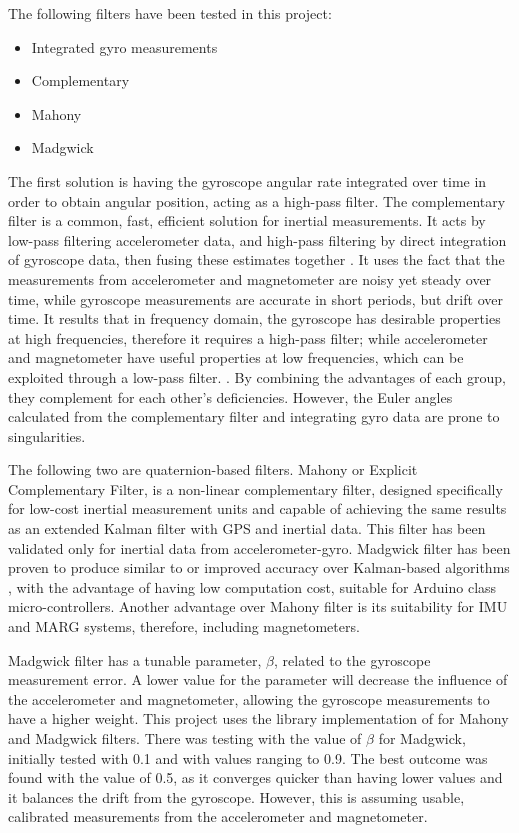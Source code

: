 The following filters have been tested in this project:
 
\begin{itemize}
\item Integrated gyro measurements
\item Complementary
\item Mahony
\item Madgwick
\end{itemize}

The first solution is having the gyroscope angular rate integrated over time in order to obtain angular position, acting as a high-pass filter.
The complementary filter is a common, fast, efficient solution for inertial measurements. It acts by low-pass filtering accelerometer data, and high-pass filtering by direct integration of gyroscope data, then fusing  these estimates together \cite{euston2008complementary}. 
It uses the fact that the measurements from accelerometer and magnetometer are noisy yet steady over time, while gyroscope measurements are accurate in short periods, but drift over time. It results that in frequency domain, the gyroscope has desirable properties at high frequencies, therefore it requires a high-pass filter; while accelerometer and magnetometer have useful properties at low frequencies, which can be exploited through a low-pass filter.  \cite{kok2017using}. By combining the advantages of each group, they complement for each other's deficiencies. However, the Euler angles calculated from the complementary filter and integrating gyro data are prone to singularities. 

The following two are quaternion-based filters. 
Mahony or Explicit Complementary Filter, is a non-linear complementary filter, designed specifically for low-cost inertial measurement units and capable of achieving the same results as an extended Kalman filter with GPS and inertial data. This filter has been validated only for inertial data from accelerometer-gyro. \cite{euston2008complementary}
Madgwick filter has been proven to produce similar to \cite{cirillo2016comparison} or improved accuracy over Kalman-based algorithms \cite{madgwick2010efficient}, with the advantage of having low computation cost, suitable for Arduino class micro-controllers. Another advantage over Mahony filter is its suitability for IMU and MARG systems, therefore, including magnetometers.

Madgwick filter has a tunable parameter, $\beta$, related to the gyroscope measurement error. A lower value for the parameter will decrease the influence of the accelerometer and magnetometer, allowing the gyroscope measurements to have a higher weight\cite{madgwick2010efficient}. This project uses the library implementation of \cite{SensorFusion} for Mahony and Madgwick filters. There was testing with the value of $\beta$ for Madgwick, initially tested with 0.1 and with values ranging to 0.9. The best outcome was found with the value of 0.5, as it converges quicker than having lower values and it balances the drift from the gyroscope. However, this is assuming usable, calibrated measurements from the accelerometer and magnetometer.

